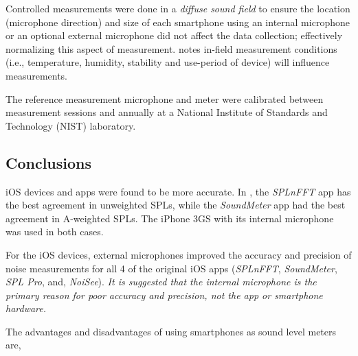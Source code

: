 Controlled measurements were done in a \textit{diffuse sound field} to ensure the location (microphone direction) and size of each smartphone using an internal microphone \citep{kardous_and_shaw_2014}  or an optional external microphone \citep{kardous_and_shaw_2016} did not affect the data collection;   effectively normalizing this aspect of measurement.  \cite{kardous_and_shaw_2014} notes in-field measurement conditions (i.e., temperature, humidity, stability and use-period of device) will influence measurements.

The reference measurement microphone and meter were calibrated between measurement sessions and annually at a National Institute of Standards and Technology (NIST) laboratory.


%
%






\vspace{-0.5cm}
\subsection*{Conclusions}

\vspace{-0.3cm}
iOS devices and apps were found to be more accurate.  In \cite{kardous_and_shaw_2014}, the \textit{SPLnFFT} app has the best agreement in unweighted SPLs, while the \textit{SoundMeter} app had the best agreement in A-weighted SPLs.  The iPhone 3GS with its internal microphone was used in both cases.

For the iOS devices, external microphones improved the accuracy and precision of noise measurements \citep{kardous_and_shaw_2016} for all 4 of the original iOS apps (\textit{SPLnFFT}, \textit{SoundMeter}, \textit{SPL Pro}, and, \textit{NoiSee}).  \textit{It is suggested that the internal microphone is the primary reason for poor accuracy and precision, not the app or smartphone hardware.}

The advantages and disadvantages of using smartphones as sound level meters are,

